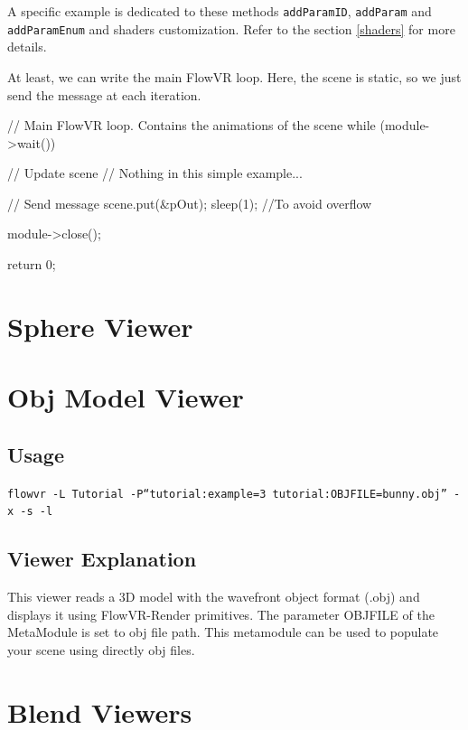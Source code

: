 \documentclass[a4paper,12pt,titlepage]{article}
\begin{document}
A specific example is dedicated to these methods \texttt{addParamID}, \texttt{addParam} and \texttt{addParamEnum} and shaders customization. Refer to the section \ref{shaders} for more details. \par

At least, we can write the main FlowVR loop. Here, the scene is static, so we just send the message at each iteration. 

\begin{codeflowvr_cpp}

    // Main FlowVR loop. Contains the animations of the scene
    while (module->wait())
    {
    	// Update scene
    	// Nothing in this simple example...

    	// Send message
    	scene.put(&pOut);
    	sleep(1);	//To avoid overflow
    }

    module->close();

    return 0;

\end{codeflowvr_cpp} \par

\section{Sphere Viewer}
\label{sphere}

\section{Obj Model Viewer}
\label{obj}
\subsection{Usage}

\texttt{flowvr -L Tutorial -P``tutorial:example=3 tutorial:OBJFILE=bunny.obj'' -x -s -l}

\subsection{Viewer Explanation}
This viewer reads a 3D model with the wavefront object format (.obj) and displays it using FlowVR-Render primitives. The parameter OBJFILE of the MetaModule is set to obj file path. This metamodule can be used to populate your scene using directly obj files.\par 

\section{Blend Viewers}
\label{blend}
\end{document}
